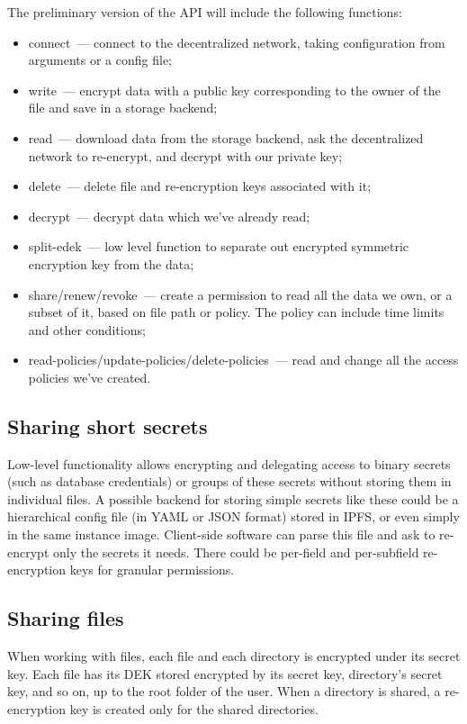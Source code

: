 \documentclass[longbibliography]{revtex4-1}
\begin{document}
The preliminary version of the API will include the following functions:
\begin{itemize}
    \item connect~--- connect to the decentralized network,
        taking configuration from arguments or a config file;
    \item write~--- encrypt data with a public key corresponding to the owner of the file and save in a storage backend;
    \item read~--- download data from the storage backend, ask the decentralized network to re-encrypt, and decrypt with our private key;
    \item delete~--- delete file and re-encryption keys associated with it;
    \item decrypt~--- decrypt data which we've already read;
    \item split-edek~--- low level function to separate out encrypted symmetric encryption key from the data;
    \item share/renew/revoke~--- create a permission to read all the data we own, or a subset of it, based on file path or policy.
        The policy can include time limits and other conditions;
    \item read-policies/update-policies/delete-policies~--- read and change all the access policies we've created.
\end{itemize}

\subsection{Sharing short secrets}

Low-level functionality allows encrypting and delegating access to binary secrets (such as database credentials) or groups of these secrets without
storing them in individual files.
A possible backend for storing simple secrets like these could be a hierarchical config file (in YAML or JSON format) stored in IPFS,
or even simply in the same instance image.
Client-side software can parse this file and ask to re-encrypt only the secrets it needs.
There could be per-field and per-subfield re-encryption keys for granular permissions.

\subsection{Sharing files}

When working with files, each file and each directory is encrypted under its secret key.
Each file has its DEK stored encrypted by its secret key, directory's secret key, and so on, up to the root folder of the user.
When a directory is shared, a re-encryption key is created only for the shared directories.
\end{document}
